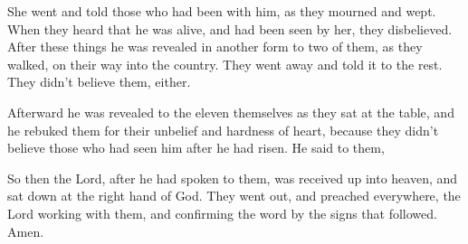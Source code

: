 {She went and told those who had been with him, as they mourned and wept.
When they heard that he was alive, and had been seen by her, they disbelieved.
After these things he was revealed in another form to two of them, as they walked, on their way into the country.
They went away and told it to the rest. They didn’t believe them, either.
\par }{\PP {}Afterward he was revealed to the eleven themselves as they sat at the table, and he rebuked them for their unbelief and hardness of heart, because they didn’t believe those who had seen him after he had risen.
He said to them,
{}
\par }{\PP {}So then the Lord, after he had spoken to them, was received up into heaven, and sat down at the right hand of God.
They went out, and preached everywhere, the Lord working with them, and confirming the word by the signs that followed. Amen.
\par }
